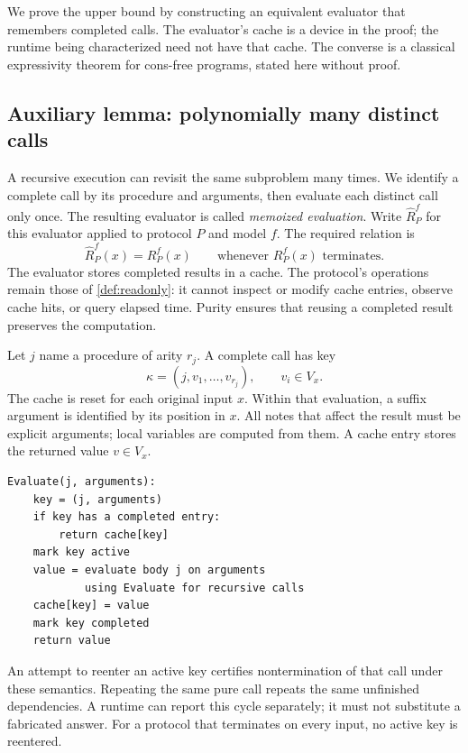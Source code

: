 \documentclass[11pt,twoside]{article}
\theoremstyle{definition}
\theoremstyle{remark}
\begin{document}
We prove the upper bound by constructing an equivalent evaluator that
remembers completed calls. The evaluator's cache is a device in the proof;
the runtime being characterized need not have that cache. The converse is
a classical expressivity theorem for cons-free programs, stated here without
proof.

\subsection{Auxiliary lemma: polynomially many distinct calls}

A recursive execution can revisit the same subproblem many times. We identify
a complete call by its procedure and arguments, then evaluate each distinct
call only once. The resulting evaluator is called \emph{memoized evaluation}.
Write $\widehat R_P^f$ for this evaluator applied to protocol $P$ and model $f$.
The required relation is
\begin{equation}
 \widehat R_P^f(x)=R_P^f(x)
 \qquad\text{whenever }R_P^f(x)\text{ terminates}.
 \label{eq:cache-preservation}
\end{equation}
The evaluator stores completed results in a cache. The protocol's operations
remain those of \cref{def:readonly}: it cannot inspect or modify cache
entries, observe cache hits, or query elapsed time. Purity ensures that
reusing a completed result preserves the computation.

Let $j$ name a procedure of arity $r_j$. A complete call has key
\begin{equation}
 \kappa=(j,v_1,\ldots,v_{r_j}),\qquad v_i\in V_x.
 \label{eq:call-key}
\end{equation}
The cache is reset for each original input $x$. Within that evaluation, a
suffix argument is identified by its position in $x$. All notes that affect
the result must be explicit arguments; local variables are computed from
them. A cache entry stores the returned value $v\in V_x$.

\begin{lstlisting}
Evaluate(j, arguments):
    key = (j, arguments)
    if key has a completed entry:
        return cache[key]
    mark key active
    value = evaluate body j on arguments
            using Evaluate for recursive calls
    cache[key] = value
    mark key completed
    return value
\end{lstlisting}
An attempt to reenter an active key certifies nontermination of that call
under these semantics. Repeating the same pure call repeats the same
unfinished dependencies. A runtime can report this cycle separately; it
must not substitute a fabricated answer. For a protocol that terminates on
every input, no active key is reentered.
\end{document}
